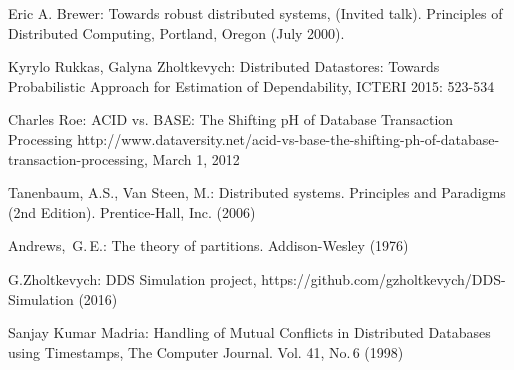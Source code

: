 \documentclass[a4paper,14pt]{llncs}
\begin{document}
\begin{thebibliography}{00}
Eric A. Brewer:
Towards robust distributed systems,
(Invited talk). Principles of Distributed Computing, Portland, Oregon (July 2000).

Kyrylo Rukkas, Galyna Zholtkevych:
Distributed Datastores: Towards Probabilistic Approach for Estimation of Dependability,
ICTERI 2015: 523-534

Charles Roe:
ACID vs. BASE: The Shifting pH of Database Transaction Processing
http://www.dataversity.net/acid-vs-base-the-shifting-ph-of-database-transaction-processing, March 1, 2012

Tanenbaum, A.S., Van Steen, M.:
Distributed systems. Principles and Paradigms (2nd Edition).
Prentice-Hall, Inc. (2006)

Andrews,~G.\,E.:
The theory of partitions.
Addison-Wesley (1976)


G.Zholtkevych: 
DDS Simulation project,
https://github.com/gzholtkevych/DDS-Simulation (2016) 

Sanjay Kumar Madria: 
Handling of Mutual Conflicts in Distributed Databases using Timestamps,
The Computer Journal. Vol. 41, No.\,6 (1998) 

\end{thebibliography}
\end{document}
